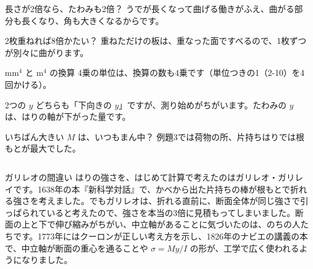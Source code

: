 \begin{tsumazuki}{長さが2倍なら、たわみも2倍？}
うでが長くなって曲げる働きがふえ、曲がる部分も長くなり、角も大きくなるからです。
\end{tsumazuki}
\begin{tsumazuki}{2枚重ねれば8倍かたい？}
重ねただけの板は、重なった面ですべるので、1枚ずつが別々に曲がります。
\end{tsumazuki}
\begin{tsumazuki}{mm$^4$ と m$^4$ の換算}
4乗の単位は、換算の数も4乗です（単位つきの1（2-10）を4回かける）。
\end{tsumazuki}
\begin{tsumazuki}{2つの $y$}
どちらも「下向きの $y$」ですが、測り始めがちがいます。たわみの $y$ は、はりの軸が下がった量です。
\end{tsumazuki}
\begin{tsumazuki}{いちばん大きい $M$ は、いつもまん中？}
例題3では荷物の所、片持ちはりでは根もとが最大でした。
\end{tsumazuki}

\begin{column}{ガリレオの間違い}
はりの強さを、はじめて計算で考えたのはガリレオ・ガリレイです。1638年の本『新科学対話』で、かべから出た片持ちの棒が根もとで折れる強さを考えました。でもガリレオは、折れる直前に、断面全体が同じ強さで引っぱられていると考えたので、強さを本当の3倍に見積もってしまいました。断面の上と下で伸び縮みがちがい、中立軸があることに気づいたのは、のちの人たちです。1773年にはクーロンが正しい考え方を示し、1826年のナビエの講義の本で、中立軸が断面の重心を通ることや $\sigma=My/I$ の形が、工学で広く使われるようになりました。
\end{column}


